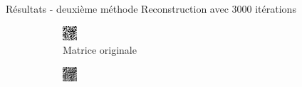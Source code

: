 \documentclass{beamer}
\begin{document}
\begin{frame}{Résultats - deuxième méthode}
    Reconstruction avec $3 000$ itérations
    \begin{figure}[t]
        \centering
        \begin{subfigure}[b]{0.35\textwidth}
            \includegraphics[width=\textwidth]{matOriginale3.png}
            \caption{Matrice originale}
        \end{subfigure}
        \qquad \qquad 
        \pause
        \begin{subfigure}[b]{0.35\textwidth}
            \includegraphics[width=\textwidth]{matReconstruction3.png}

\end{subfigure}
\end{figure}
\end{frame}
\end{document}
